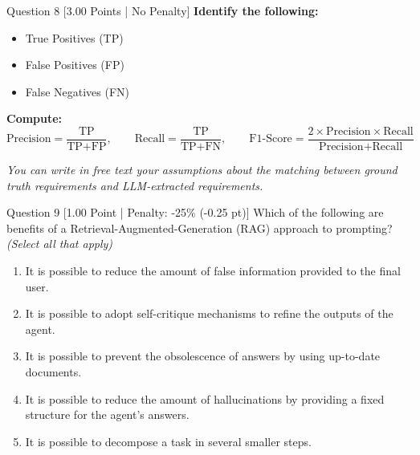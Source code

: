 \documentclass[11pt,a4paper]{article}
\begin{document}
\begin{questionbox}{Question 8 \hfill [3.00 Points | No Penalty]}
\noindent\textbf{Identify the following:}
\begin{itemize}[noitemsep]
    \item True Positives (TP)
    \item False Positives (FP)
    \item False Negatives (FN)
\end{itemize}

\noindent\textbf{Compute:}
\begin{equation*}
\text{Precision} = \frac{\text{TP}}{\text{TP} + \text{FP}}, \qquad
\text{Recall} = \frac{\text{TP}}{\text{TP} + \text{FN}}, \qquad
\text{F1-Score} = \frac{2 \times \text{Precision} \times \text{Recall}}{\text{Precision} + \text{Recall}}
\end{equation*}

\noindent\textit{You can write in free text your assumptions about the matching between ground truth requirements and LLM-extracted requirements.}
\end{questionbox}

\vspace{0.3cm}

\begin{questionbox}{Question 9 \hfill [1.00 Point | Penalty: -25\% (-0.25 pt)]}
Which of the following are benefits of a Retrieval-Augmented-Generation (RAG) approach to prompting? \textit{(Select all that apply)}

\begin{enumerate}[label=\alph*.,itemsep=2pt]
    \item It is possible to reduce the amount of false information provided to the final user.
    \item It is possible to adopt self-critique mechanisms to refine the outputs of the agent.
    \item It is possible to prevent the obsolescence of answers by using up-to-date documents.
    \item It is possible to reduce the amount of hallucinations by providing a fixed structure for the agent's answers.
    \item It is possible to decompose a task in several smaller steps.
\end{enumerate}
\end{questionbox}

\vspace{0.3cm}
\end{document}

